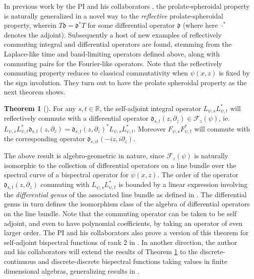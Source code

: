 \documentclass[11pt,letterpaper]{article}
\theoremstyle{definition}
\newtheorem{thm}{Theorem}
\newcommand{\bbr}{\mathbb{R}}
\newcommand{\vocab}[1]{\emph{#1}}
\begin{document}
In previous work by the PI and his collaborators \cite{CGYZ}, the prolate-spheroidal property is naturally generalized in a novel way to the \vocab{reflective} prolate-spheroidal property, wherein $T\mathfrak d = \mathfrak d^*T$ for some differential operator $\mathfrak d$ (where here $\cdot^*$ denotes the adjoint).
Subsequently a host of new examples of reflectively commuting integral and differential operators are found, stemming from the Laplace-like time and band-limiting operators defined above, along with commuting pairs for the Fourier-like operators.
Note that the reflectively commuting property reduces to classical commutativity when $\psi(x,z)$ is fixed by the sign involution.
They turn out to have the prolate spheroidal property as the next theorem shows.
\begin{thm}[\cite{CGYZ}]\label{thm:commuting integral}
For any $s,t\in\bbr$, the self-adjoint integral operator $L_{\psi,s}L_{\psi,t}^*$ will reflectively commute with a differential operator $\mathfrak d_{s,t}(z,\partial_z)\in\mathcal F_z(\psi)$, ie. $L_{\psi,s}L_{\psi,t}^*\mathfrak d_{s,t}(z,\partial_z) = \mathfrak d_{s,t}(z,\partial_z)^*L_{\psi,s}L_{\psi,t}^*$.
Moreover $F_{\psi,s}F_{\psi,t}^*$ will commute with the corresponding operator $\mathfrak d_{s,it}(-iz,i\partial_z)$.
\end{thm}
The above result is algebro-geometric in nature, since $\mathcal F_z(\psi)$ is naturally isomorphic to the collection of differential operators on a line bundle over the spectral curve of a bispectral operator for $\psi(x,z)$.
The order of the operator $\mathfrak d_{s,t}(z,\partial_z)$ commuting with $L_{\psi,s}L_{\psi,t}^*$ is bounded by a linear expression involving the \emph{differential genus} of the associated line bundle as defined in \cite{BW}.
The differential genus in turn defines the isomorphism class of the algebra of differential operators on the line bundle.
Note that the commuting operator can be taken to be self adjoint, and even to have polynomial coefficients, by taking an operator of even larger order.
The PI and his collaborators also prove a version of this theorem for self-adjoint bispectral functions of rank $2$ in \cite{CY2019}.
In another direction, the author and his collaborators will extend the results of Theorem \ref{thm:commuting integral} to the discrete-continuous and discrete-discrete bispectral functions taking values in finite dimensional algebras, generalizing results in \cite{GPZ,Grunbaum-CMP2018}.
\end{document}

